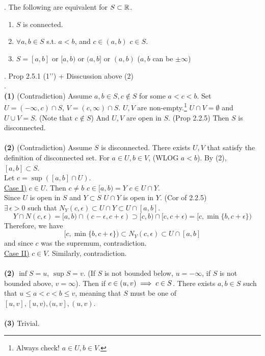 \\
\\
\thm{}. The following are equivalent for $S\subset \mathbb{R}$.
\begin{enumerate}
	\item $S$ is connected.
	\item $\forall a, b\in S$ s.t. $a<b$, and $c\in (a, b)$ \mimp $c\in S$.
	\item $S = [a, b]$ or $[a, b)$ or $(a, b]$ or $(a, b)$ ($a, b$ can be $\pm\infty$)
\end{enumerate} 
\rmk. Prop 2.5.1 (1'') + Disscussion above (2)\\
\pf.\\
\textbf{(1)} (Contradiction) Assume $a, b\in S, c\notin S$ for some $a<c<b$. Set $U = (-\infty, c)\cap S$, $V = (c, \infty)\cap S$. $U, V$ are non-empty.\footnote{Always check! $a\in U, b\in V$.} $U \cap V = \emptyset$ and $U\cup V = S$. (Note that $c\notin S$) And $U, V$ are open in $S$. (Prop 2.2.5) Then $S$ is disconnected.\\
\\
\textbf{(2)} (Contradiction) Assume $S$ is disconnected. There exists $U, V$ that satisfy the definition of disconnected set. For $a\in U, b\in V$, (WLOG $a<b$). By (2), $[a, b]\subset S$.\\
Let $c = \sup([a, b]\cap U)$.\\
\underline{Case I)} $c\in U$. Then $c\neq b$ \mimp $c\in [a, b) = Y$ \mimp $c\in U\cap Y$.\\
Since $U$ is open in $S$ and $Y\subset S$ \mimp $U\cap Y$ is open in $Y$. (Cor of 2.2.5)\\
\mimp $\exists\, \epsilon>0$ such that $N_Y(c, \epsilon) \subset U\cap Y \subset U\cap [a, b]$.
$$Y\cap N(c, \epsilon) = [a, b)\cap (c-\epsilon, c+\epsilon)\supset [c, b)\cap [c, c+\epsilon) = [c, \min\{b, c+\epsilon\})$$
Therefore, we have $$[c, \min\{b, c+\epsilon\}) \subset N_Y(c, \epsilon) \subset U\cap [a, b]$$
and since $c$ was the supremum, contradiction. 
\\
\underline{Case II)} $c\in V$. Similarly, contradiction.\\
\\
\textbf{(2)} $\inf S = u$, $\sup S = v$. (If $S$ is not bounded below, $u = -\infty$, if $S$ is not bounded above, $v = \infty$). Then if $c\in (u, v) \implies c\in S$. There exists $a, b\in S$ such that $u \leq a < c < b \leq v$, meaning that $S$ must be one of $[u, v], [u, v), (u, v], (u, v)$.\\
\\
\textbf{(3)} Trivial.
\pagebreak